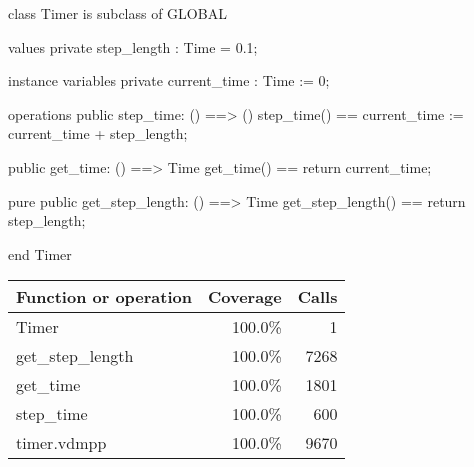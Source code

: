 \documentclass[a4paper]{article}
\begin{document}
\title{}
\author{}
\begin{vdm_al}
class Timer is subclass of GLOBAL

values 
    private step_length : Time = 0.1;

instance variables
    private current_time : Time := 0;

operations
    public step_time: () ==> ()
    step_time() == current_time := current_time + step_length;

    public get_time: () ==> Time
    get_time() == return current_time;

    pure public get_step_length: () ==> Time
    get_step_length() == return step_length;

end Timer
\end{vdm_al}
\bigskip
\begin{longtable}{|l|r|r|}
\hline
Function or operation & Coverage & Calls \\
\hline
\hline
Timer & 100.0\% & 1 \\
\hline
get\_step\_length & 100.0\% & 7268 \\
\hline
get\_time & 100.0\% & 1801 \\
\hline
step\_time & 100.0\% & 600 \\
\hline
\hline
timer.vdmpp & 100.0\% & 9670 \\
\hline
\end{longtable}
\end{document}
